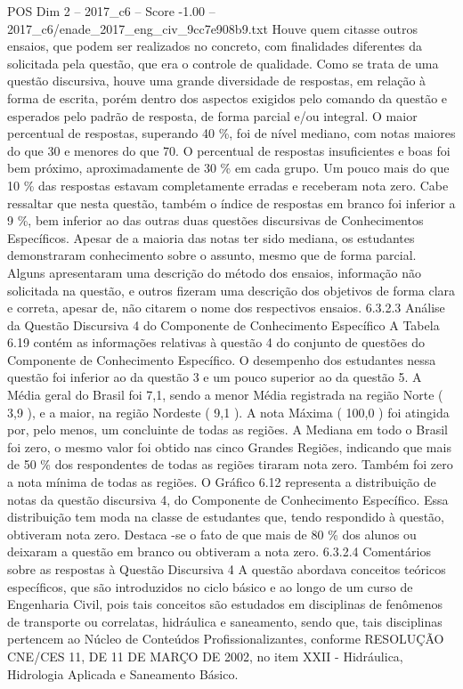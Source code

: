 \begin{textsample}{POS Dim 2 – 2017\_c6 – Score -1.00 – 2017\_c6/enade\_2017\_eng\_civ\_9cc7e908b9.txt}
Houve quem citasse outros ensaios, que podem ser realizados no concreto, com finalidades diferentes da solicitada pela questão, que era o controle de qualidade.
Como se trata de uma questão discursiva, houve uma grande diversidade de respostas, em relação à forma de escrita, porém dentro dos aspectos exigidos pelo comando da questão e esperados pelo padrão de resposta, de forma parcial e/ou integral.
O maior percentual de respostas, superando 40 \%, foi de nível mediano, com notas maiores do que 30 e menores do que 70.
O percentual de respostas insuficientes e boas foi bem próximo, aproximadamente de 30 \% em cada grupo.
Um pouco mais do que 10 \% das respostas estavam completamente erradas e receberam nota zero.
Cabe ressaltar que nesta questão, também o índice de respostas em branco foi inferior a 9 \%, bem inferior ao das outras duas questões discursivas de Conhecimentos Específicos.
Apesar de a maioria das notas ter sido mediana, os estudantes demonstraram conhecimento sobre o assunto, mesmo que de forma parcial.
Alguns apresentaram uma descrição do método dos ensaios, informação não solicitada na questão, e outros fizeram uma descrição dos objetivos de forma clara e correta, apesar de, não citarem o nome dos respectivos ensaios. 6.3.2.3 Análise da Questão Discursiva 4 do Componente de Conhecimento Específico A Tabela 6.19 contém as informações relativas à questão 4 do conjunto de questões do Componente de Conhecimento Específico.
O desempenho dos estudantes nessa questão foi inferior ao da questão 3 e um pouco superior ao da questão 5.
A Média geral do Brasil foi 7,1, sendo a menor Média registrada na região Norte ( 3,9 ), e a maior, na região Nordeste ( 9,1 ).
A nota Máxima ( 100,0 ) foi atingida por, pelo menos, um concluinte de todas as regiões.
A Mediana em todo o Brasil foi zero, o mesmo valor foi obtido nas cinco Grandes Regiões, indicando que mais de 50 \% dos respondentes de todas as regiões tiraram nota zero.
Também foi zero a nota mínima de todas as regiões.
O Gráfico 6.12 representa a distribuição de notas da questão discursiva 4, do Componente de Conhecimento Específico.
Essa distribuição tem moda na classe de estudantes que, tendo respondido à questão, obtiveram nota zero.
Destaca -se o fato de que mais de 80 \% dos alunos ou deixaram a questão em branco ou obtiveram a nota zero. 6.3.2.4 Comentários sobre as respostas à Questão Discursiva 4 A questão abordava conceitos teóricos específicos, que são introduzidos no ciclo básico e ao longo de um curso de Engenharia Civil, pois tais conceitos são estudados em disciplinas de fenômenos de transporte ou correlatas, hidráulica e saneamento, sendo que, tais disciplinas pertencem ao Núcleo de Conteúdos Profissionalizantes, conforme RESOLUÇÃO CNE/CES 11, DE 11 DE MARÇO DE 2002, no item XXII - Hidráulica, Hidrologia Aplicada e Saneamento Básico.

\end{textsample}
